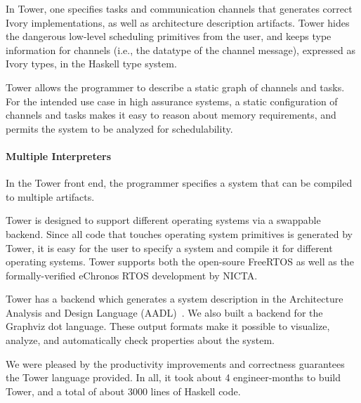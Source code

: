 In Tower, one specifies tasks and communication channels that generates correct
Ivory implementations, as well as architecture description artifacts. Tower
hides the dangerous low-level scheduling primitives from the user, and keeps
type information for channels (i.e., the datatype of the channel message),
expressed as Ivory types, in the Haskell type system.

Tower allows the programmer to describe a static graph of channels and tasks.
For the intended use case in high assurance systems, a static configuration of
channels and tasks makes it easy to reason about memory requirements, and
permits the system to be analyzed for schedulability.

\paragraph{Multiple Interpreters}

In the Tower front end, the programmer specifies a system that can be compiled
to multiple artifacts.

Tower is designed to support different operating systems via a swappable
backend. Since all code that touches operating system primitives is generated by
Tower, it is easy for the user to specify a system and compile it for
different operating systems. Tower supports both the open-soure
FreeRTOS\cite{freertos} as well as the formally-verified
eChronos RTOS\cite{echronos} development by NICTA.

Tower has a backend which generates a system description in the Architecture
Analysis and Design Language (AADL)~\cite{SAE:AADL}. We also built a backend for
the Graphviz dot language.  These output formats make it possible to visualize,
analyze, and automatically check properties about the system.

We were pleased by the productivity improvements and correctness guarantees the
Tower language provided. In all, it took about 4 engineer-months to build Tower,
and a total of about 3000 lines of Haskell code.



